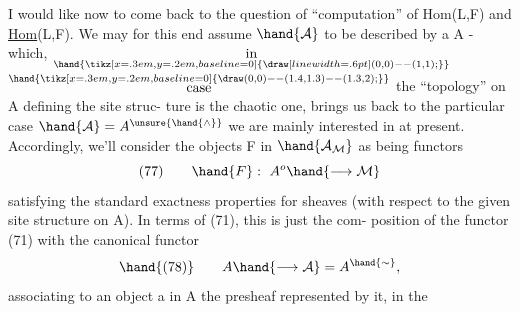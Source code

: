 I would like now to come back to the question of ``computation'' of
Hom(L,F) and \underline{Hom}(L,F). We may for this end assume $\hand{\mathcal{A}}$ to be described by
a \hand{\uline{\textcolor{black}{site}}} A  - which, \(\underset{\hand{\tikz[x=.3em,y=.2em,baseline=0]{\draw[line width=.6pt] (0,0)--(1,1);}}}{\text{in}}\) \(\overset{\hand{\tikz[x=.3em,y=.2em,baseline=0]{\draw (0,0)--(1.4,1.3)--(1.3,2);}}}{\text{case}}\) the ``topology'' on A defining the site struc-%
ture is the chaotic one, brings us back to the particular case $\hand{\mathcal{A}} = A^{\unsure{\hand{\wedge}}}$\hand{/} we
are mainly interested in at present. Accordingly, we'll consider the
objects F in $\hand{\mathcal{A}_{\mathcal{M}}}$ as being functors
\[ (77) \qquad \hand{F}: \ A^{o} \hand{\longrightarrow \mathcal{M}} \]
satisfying the standard exactness properties for sheaves (with respect to
the given site structure on A). In terms of (71), this is just the com-%
position of the functor (71) with the canonical functor
\[ \hand{(78)} \qquad A \hand{\longrightarrow \mathcal{A}} = A^{\hand{\sim}} , \]
associating to an object a in A the presheaf represented by it, in the

